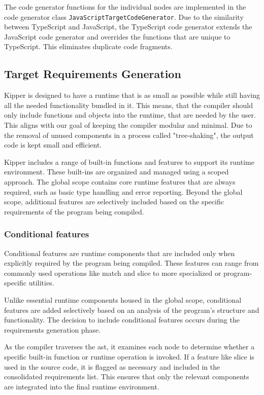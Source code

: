 The code generator functions for the individual nodes are implemented in the code generator class \lstinline|JavaScriptTargetCodeGenerator|. Due to the similarity between TypeScript and JavaScript, the TypeScript code generator extends the JavaScript code generator and overrides the functions that are unique to TypeScript. This eliminates duplicate code fragments.

\subsection{Target Requirements Generation}
\label{sec:requirements}

Kipper is designed to have a runtime that is as small as possible while still having all the needed functionality bundled in it. This means, that the compiler should only include functions and objects into the runtime, that are needed by the user. This aligns with our goal of keeping the compiler modular and minimal. Due to the removal of unused components in a process called "tree-shaking", the output code is kept small and efficient.

Kipper includes a range of built-in functions and features to support its runtime environment. These built-ins are organized and managed using a scoped approach. The global scope contains core runtime features that are always required, such as basic type handling and error reporting. Beyond the global scope, additional features are selectively included based on the specific requirements of the program being compiled.

\subsubsection{Conditional features}

Conditional features are runtime components that are included only when explicitly required by the program being compiled. These features can range from commonly used operations like match and slice to more specialized or program-specific utilities.

Unlike essential runtime components housed in the global scope, conditional features are added selectively based on an analysis of the program's structure and functionality. The decision to include conditional features occurs during the requirements generation phase. 

As the compiler traverses the \acrshort{ast}, it examines each node to determine whether a specific built-in function or runtime operation is invoked. If a feature like slice is used in the source code, it is flagged as necessary and included in the consolidated requirements list. This ensures that only the relevant components are integrated into the final runtime environment.

